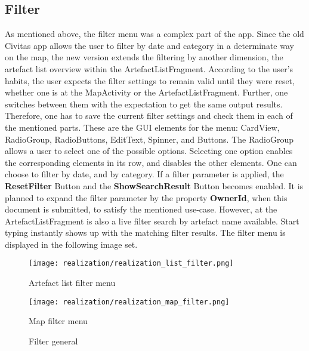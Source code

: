 \subsection{Filter}
As mentioned above, the filter menu was a complex part of the app. Since the old Civitas app allows the user to filter by date and category in a determinate way on the map, the new version extends the filtering by another dimension, the artefact list overview within the ArtefactListFragment. According to the user's habits, the user expects the filter settings to remain valid until they were reset, whether one is at the MapActivity or the ArtefactListFragment. Further, one switches between them with the expectation to get the same output results. Therefore, one has to save the current filter settings and check them in each of the mentioned parts. These are the GUI elements for the menu: CardView, RadioGroup, RadioButtons, EditText, Spinner, and Buttons. 
The RadioGroup allows a user to select one of the possible options. Selecting one option enables the corresponding elements in its row, and disables the other elements. One can choose to filter by date, and by category. If a filter parameter is applied, the \textbf{ResetFilter} Button and the \textbf{ShowSearchResult} Button becomes enabled. It is planned to expand the filter parameter by the property \textbf{OwnerId}, when this document is submitted, to satisfy the mentioned use-case. However, at the ArtefactListFragment is also a live filter search by artefact name available. Start typing instantly shows up with the matching filter results.
The filter menu is displayed in the following image set.

\begin{figure}[!htb]
  \texttt{[image: realization/realization\_list\_filter.png]}
  \caption{Artefact list filter menu}\label{fig:awesome_image1}
\endminipage\hfill
{}
  \texttt{[image: realization/realization\_map\_filter.png]}
  \caption{Map filter menu}\label{fig:awesome_image2}
\endminipage\hfill
\caption{Filter general}
\label{fig:filter general}
\end{figure}









